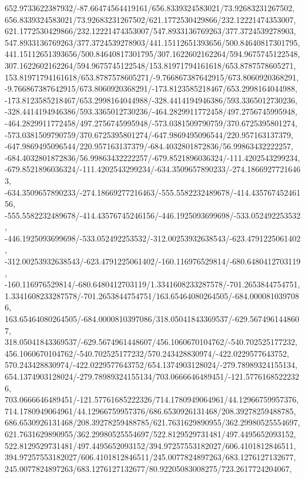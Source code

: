 {    652.9733622387932/-87.66474564419161/656.8339324583021/73.92683231267502,
    656.8339324583021/73.92683231267502/621.1772530429866/232.12221474353007,
    621.1772530429866/232.12221474353007/547.8933136769263/377.3724539278903,
    547.8933136769263/377.3724539278903/441.15112651393656/500.84640817301795,
    441.15112651393656/500.84640817301795/307.1622602162264/594.9675745122548,
    307.1622602162264/594.9675745122548/153.81971794161618/653.8787578605271,
    153.81971794161618/653.8787578605271/-9.766867387642915/673.8060920368291,
    -9.766867387642915/673.8060920368291/-173.8123585218467/653.2998164044988,
    -173.8123585218467/653.2998164044988/-328.4414194946386/593.3365012730236,
    -328.4414194946386/593.3365012730236/-464.2829911772458/497.2756745995948,
    -464.2829911772458/497.2756745995948/-573.0381509790759/370.6725395801274,
    -573.0381509790759/370.6725395801274/-647.9869495096544/220.957163137379,
    -647.9869495096544/220.957163137379/-684.4032801872836/56.99863432222257,
    -684.4032801872836/56.99863432222257/-679.8521896036324/-111.4202543299234,
    -679.8521896036324/-111.4202543299234/-634.3509657890233/-274.18669277216463,
    -634.3509657890233/-274.18669277216463/-555.5582232489678/-414.43576745246156,
    -555.5582232489678/-414.43576745246156/-446.1925093699698/-533.052492253532,
    -446.1925093699698/-533.052492253532/-312.00253932638543/-623.4791225061402,
    -312.00253932638543/-623.4791225061402/-160.116976529814/-680.6480412703119,
    -160.116976529814/-680.6480412703119/1.3341608233287578/-701.2653844754751,
    1.3341608233287578/-701.2653844754751/163.65464080264505/-684.0000810397086,
    163.65464080264505/-684.0000810397086/318.05041843369537/-629.5674961448607,
    318.05041843369537/-629.5674961448607/456.1060670104762/-540.702525177232,
    456.1060670104762/-540.702525177232/570.243428830974/-422.0229577643752,
    570.243428830974/-422.0229577643752/654.1374903128024/-279.78989324155134,
    654.1374903128024/-279.78989324155134/703.0666646489451/-121.57761685222326,
    703.0666646489451/-121.57761685222326/714.1780949064961/44.12966759957376,
    714.1780949064961/44.12966759957376/686.6530926131468/208.39278259488785,
    686.6530926131468/208.39278259488785/621.7631629890955/362.29980525554697,
    621.7631629890955/362.29980525554697/522.8129529731481/497.4495652093152,
    522.8129529731481/497.4495652093152/394.97257553182027/606.4101812846511,
    394.97257553182027/606.4101812846511/245.0077824897263/683.1276127132677,
    245.0077824897263/683.1276127132677/80.92205083008275/723.2617724204067,
}
